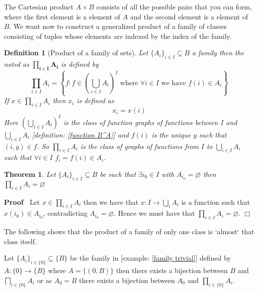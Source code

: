 \documentclass{book}
\newcommand{\tmmathbf}[1]{\ensuremath{\boldsymbol{#1}}}
\newcommand{\tmtextbf}[1]{\text{{\bfseries{#1}}}}
\newenvironment{proof}{\noindent\textbf{Proof\ }}{\hspace*{\fill}$\Box$\medskip}
\newtheorem{definition}{Definition}
{\theorembodyfont{\rmfamily}\newtheorem{example}{Example}}
\newtheorem{theorem}{Theorem}
\begin{document}
The Cartesian product $A \times B$ consists of all the possible pairs that you
can form, where the first element is a element of $A$ and the second element
is a element of $B$. We want now to construct a generalized product of a
family of classes consisting of tuples whose elements are indexed by the index
of the family.

\begin{definition}[Product of a family of sets]
  \label{product}{}Let $\{ A_i \}_{i \in I}
  \subseteq B$ a family then the \tmtextbf{product of $\{ A_i \}_{i \in I}$}
  noted as $\tmmathbf{\prod_{i \in I} A_i}$ is defined by
  \[ \prod_{i \in I} A_i = \left\{ f : f \in \left( \bigcup_{i \in I} A_i
     \right)^I \text{ where } \forall i \in I \text{ we have } f (i) \in A_i
     \right\} \]
  If $x \in \prod_{i \in I} A_i$ then $x_i$ is defined as
  \[ x_i = x (i) \]
  Here $\left( \bigcup_{i \in I} A_i \right)^I$ is the class of function
  graphs of functions between $I$ and $\bigcup_{i \in I} A_i$ [definition:
  \ref{function B^A}] and $f (i)$ is the unique $y$ such that $(i, y) \in f$.
  So $\prod_{i \in I} A_i$ is the class of graphs of functions from $I$ to
  $\bigcup_{i \in I} A_i$ such that $\forall i \in I$ $f_i = f (i) \in A_i$.
\end{definition}

\begin{theorem}
  \label{product of a empty set is empty}Let $\{ A_i \}_{i \in I} \subseteq B$
  be such that $\exists i_0 \in I$ with $A_{i_0} = \varnothing$ then $\prod_{i
  \in I} A_i = \varnothing$
\end{theorem}

\begin{proof}
  Let $x \in \prod_{i \in I} A_i$ then we have that $x : I \rightarrow
  \bigcup_i A_i$ is a function such that $x (i_0) \in A_{i_0}$, contradicting
  $A_{i_0} = \varnothing$. Hence we must have that $\prod_{i \in I} A_i =
  \varnothing$.
\end{proof}

The following shows that the product of a family of only one class is `almost`
that class itself.

\begin{example}
  \label{product of family with one element}Let $\{ A_i \}_{i \in \{ 0 \}}
  \subseteq \{ B \}$ be the family in [example: \ref{family trivial}] defined
  by $A : \{ 0 \} \rightarrow \{ B \}$ where $A = \{ (0, B) \}$ then there
  exists a bijection between $B$ and $\bigsqcap_{i \in \{ 0 \}} A_i$ or as
  $A_0 = B$ there exists a bijection between $A_0$ and $\prod_{i \in \{ 0 \}}
  A_i$.
\end{example}
\end{document}
